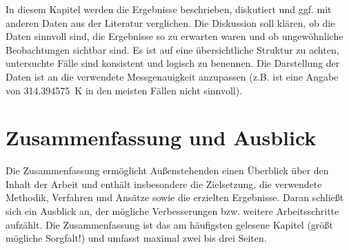 In diesem Kapitel werden die Ergebnisse beschrieben, diskutiert und ggf. mit anderen Daten aus der Literatur verglichen. Die Diskussion soll klären, ob die Daten sinnvoll sind, die Ergebnisse so zu erwarten waren und ob ungewöhnliche Beobachtungen sichtbar sind. Es ist auf eine übersichtliche Struktur zu achten, untersuchte Fälle sind konsistent und logisch zu benennen. Die Darstellung der Daten ist an die verwendete Messgenauigkeit anzupassen (z.B. ist eine Angabe von \SI{314.394575}{K} in den meisten Fällen nicht sinnvoll).

\chapter{Zusammenfassung und Ausblick}

Die Zusammenfassung ermöglicht Außenstehenden einen Überblick über den Inhalt der Arbeit und enthält insbesondere die Zielsetzung, die verwendete Methodik, Verfahren und Ansätze sowie die erzielten Ergebnisse. Daran schließt sich ein Ausblick an, der mögliche Verbesserungen bzw. weitere Arbeitsschritte aufzählt. Die Zusammenfassung ist das am häufigsten gelesene Kapitel (größt mögliche Sorgfalt!) und umfasst maximal zwei bis drei Seiten.
